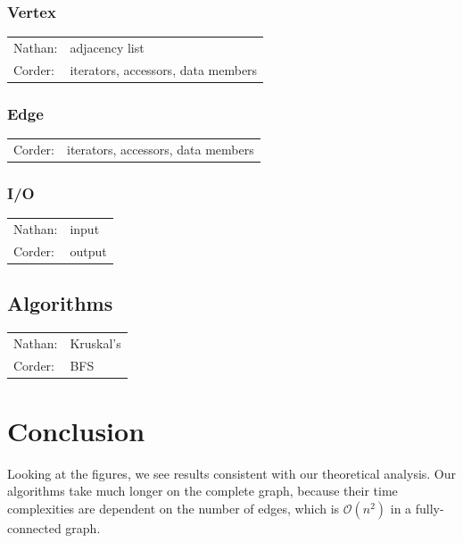 \documentclass[titlepage]{article}
\begin{document}
\begin{multicols*}{2}
            \subsubsection{Vertex}
                \begin{tabular}{l l}
                    Nathan: & adjacency list \\
                    Corder: & iterators, accessors, data members
                \end{tabular}
            \subsubsection{Edge}
                \begin{tabular}{l l}
                Corder: & iterators, accessors, data members
                \end{tabular}
            \subsubsection{I/O}
                \begin{tabular}{l l}
                   Nathan: & input \\
                   Corder: & output
                \end{tabular}
            \subsection{Algorithms}
                \begin{tabular}{l l}
                    Nathan: & Kruskal's \\
                    Corder: & BFS
                \end{tabular}
        \section{Conclusion}
            Looking at the figures, we see results consistent with our theoretical analysis. Our algorithms take much longer on the complete graph, because their time complexities are dependent on the number of edges, which is $\mathcal{O}(n^2)$ in a fully-connected graph.
    \end{multicols*}
\end{document}
